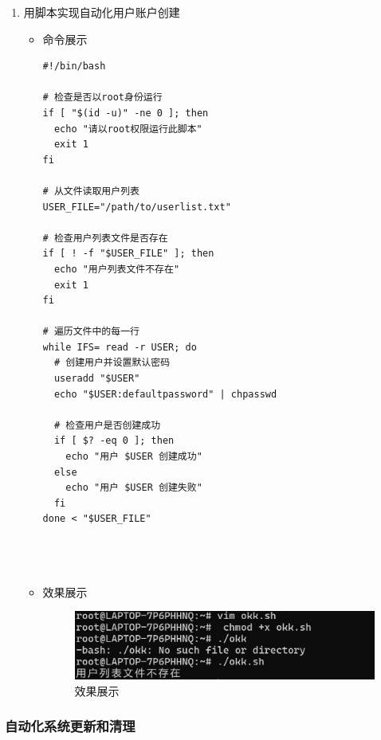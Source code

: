 \documentclass[UTF8]{ctexart}
\begin{document}
\begin{enumerate}
  \item 用脚本实现自动化用户账户创建
  \begin{itemize}
  \item 命令展示
  \begin{verbatim}
#!/bin/bash

# 检查是否以root身份运行
if [ "$(id -u)" -ne 0 ]; then
  echo "请以root权限运行此脚本"
  exit 1
fi

# 从文件读取用户列表
USER_FILE="/path/to/userlist.txt"

# 检查用户列表文件是否存在
if [ ! -f "$USER_FILE" ]; then
  echo "用户列表文件不存在"
  exit 1
fi

# 遍历文件中的每一行
while IFS= read -r USER; do
  # 创建用户并设置默认密码
  useradd "$USER"
  echo "$USER:defaultpassword" | chpasswd
  
  # 检查用户是否创建成功
  if [ $? -eq 0 ]; then
    echo "用户 $USER 创建成功"
  else
    echo "用户 $USER 创建失败"
  fi
done < "$USER_FILE"


    
  \end{verbatim}

  \item 效果展示
  \begin{figure}[H]
    \centering
    \includegraphics[width=\textwidth]{10} %
    \caption{效果展示}
  
  \end{figure}
\end{itemize}
\end{enumerate}
\subsubsection{自动化系统更新和清理}
\end{document}
